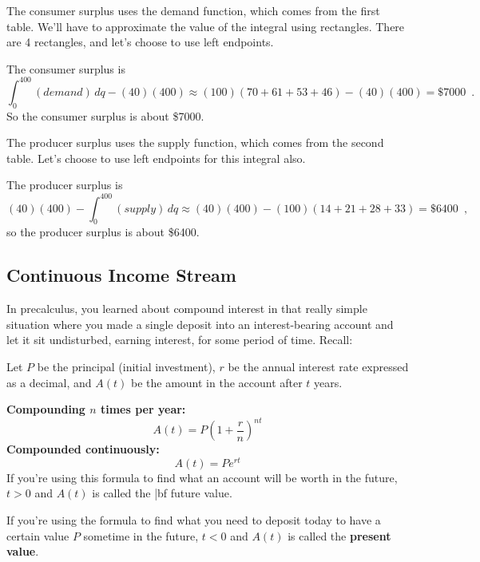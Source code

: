 \begin{example}
\begin{enumerate}[label=(\alph*)]
    \begin{solution}
      The consumer surplus uses the demand function, which comes from the first table. We'll have to approximate the value of the integral using rectangles. There are 4 rectangles, and let's choose to use left endpoints.

      The consumer surplus is
      $$\int_0^{400}(demand)\,dq - (40)(400) \approx   (100)(70+61+53+46)-(40)(400)=\$7000 \enspace .$$
      So the consumer surplus is about \$7000.

      The producer surplus uses the supply function, which comes from the second table. Let's choose to use left endpoints for this integral also.

      The producer surplus is
      $$(40)(400) - \int_0^{400}(supply)\,dq\approx   (40)(400)-(100)(14+21+28+33)=\$6400 \enspace ,$$
      so the producer surplus is about \$6400.
    \end{solution}
  \end{enumerate}
\end{example}

\subsection{Continuous Income Stream}
In precalculus, you learned about compound interest in that really simple situation where you made a single deposit into an interest-bearing account and let it sit undisturbed, earning interest, for some period of time. Recall:

\begin{definition}
Let $P$ be the principal (initial investment), $r$ be the annual interest rate expressed as a decimal, and $A(t)$ be the amount in the account after $t$ years.

{\bf Compounding $n$ times per year:}
$$A(t)=P\left(1+\frac{r}{n}\right)^{nt}$$
{\bf Compounded continuously:}
$$A(t)=Pe^{rt}$$
If you're using this formula to find what an account will be worth in the future, $t>0$ and $A(t)$ is called the {|bf future value}.

If you're using the formula to find what you need to deposit today to have a certain value $P$ sometime in the future, $t<0$ and $A(t)$ is called the {\bf present value}.
\end{definition}

